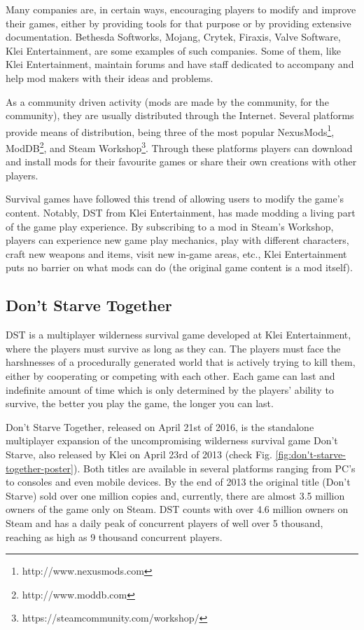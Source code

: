 Many companies are, in certain ways, encouraging players to modify and improve their games, either by providing tools for that purpose or by providing extensive documentation.
Bethesda Softworks, Mojang, Crytek, Firaxis, Valve Software, Klei Entertainment, are some examples of such companies.
Some of them, like Klei Entertainment, maintain forums and have staff dedicated to accompany and help mod makers with their ideas and problems.

As a community driven activity (mods are made by the community, for the community), they are usually distributed through the Internet.
Several platforms provide means of distribution, being three of the most popular NexusMods\footnote{http://www.nexusmods.com}, ModDB\footnote{http://www.moddb.com}, and Steam Workshop\footnote{https://steamcommunity.com/workshop/}.
Through these platforms players can download and install mods for their favourite games or share their own creations with other players.

Survival games have followed this trend of allowing users to modify the game's content.
Notably, \ac{DST} from Klei Entertainment, has made modding a living part of the game play experience.
By subscribing to a mod in Steam's Workshop, players can experience new game play mechanics, play with different characters, craft new weapons and items, visit new in-game areas, etc., Klei Entertainment puts no barrier on what mods can do (the original game content is a mod itself).


\subsection{Don't Starve Together}
\ac{DST} is a multiplayer wilderness survival game developed at Klei Entertainment, where the players must survive as long as they can.
The players must face the harshnesses of a procedurally generated world that is actively trying to kill them, either by cooperating or competing with each other.
Each game can last and indefinite amount of time which is only determined by the players' ability to survive, the better you play the game, the longer you can last.

Don't Starve Together, released on April 21st of 2016, is the standalone multiplayer expansion of the uncompromising wilderness survival game Don't Starve, also released by Klei on April 23rd of 2013 (check Fig. \ref{fig:don't-starve-together-poster}).
Both titles are available in several platforms ranging from PC's to consoles and even mobile devices.
By the end of 2013 the original title (Don't Starve) sold over one million copies and, currently, there are almost 3.5 million owners of the game only on Steam.
\ac{DST} counts with over 4.6 million owners on Steam and has a daily peak of concurrent players of well over 5 thousand, reaching as high as 9 thousand concurrent players.

